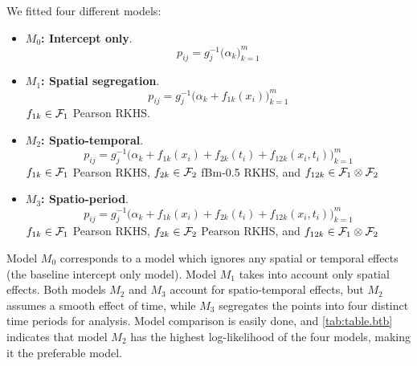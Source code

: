 \documentclass[a4paper,showframe,11pt]{report}\usepackage[]{graphicx}\usepackage[]{color}
\begin{document}
We fitted four different models: 
\begin{itemize}
  \item \textbf{\boldmath$M_0$: Intercept only}.
  \[
    p_{ij} = g^{-1}_j\big( \alpha_k \big)_{k=1}^m
  \]
  \item \textbf{\boldmath$M_1$: Spatial segregation}.
  \[
    p_{ij} = g^{-1}_j\big(\alpha_k + f_{1k}(x_i) \big)_{k=1}^m
  \]
  $f_{1k} \in {\mathcal F}_1$ Pearson RKHS.
  \item \textbf{\boldmath$M_2$: Spatio-temporal}.
  \[
    p_{ij} = g^{-1}_j\big(\alpha_k + f_{1k}(x_i) + f_{2k}(t_i) + f_{12k}(x_i,t_i) \big)_{k=1}^m
  \]
  $f_{1k} \in {\mathcal F}_1$ Pearson RKHS, $f_{2k} \in {\mathcal F}_2$ fBm-0.5 RKHS, and $f_{12k} \in {\mathcal F}_1\otimes{\mathcal F}_2$
  \item \textbf{\boldmath$M_3$: Spatio-period}.
  \[
    p_{ij} = g^{-1}_j\big(\alpha_k + f_{1k}(x_i) + f_{2k}(t_i) + f_{12k}(x_i,t_i) \big)_{k=1}^m
  \]
  $f_{1k} \in {\mathcal F}_1$ Pearson RKHS, $f_{2k} \in {\mathcal F}_2$ Pearson RKHS, and $f_{12k} \in {\mathcal F}_1\otimes{\mathcal F}_2$
\end{itemize}
Model $M_0$ corresponds to a model which ignores any spatial or temporal effects (the baseline intercept only model).
Model $M_1$ takes into account only spatial effects.
Both models $M_2$ and $M_3$ account for spatio-temporal effects, but $M_2$ assumes a smooth effect of time, while $M_3$ segregates the points into four distinct time periods for analysis.
Model comparison is easily done, and \cref{tab:table.btb} indicates that model $M_2$ has the highest log-likelihood of the four models, making it the preferable model.

\end{document}

